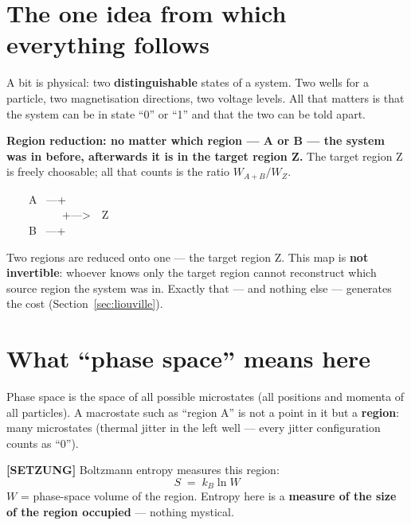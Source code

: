 \section{The one idea from which everything follows}

A bit is physical: two \textbf{distinguishable} states of a system. Two wells for
a particle, two magnetisation directions, two voltage levels. All that matters is
that the system can be in state “0” or “1” and that the two can be told apart.

\textbf{Region reduction: no matter which region --- A or B --- the system was in
before, afterwards it is in the target region Z.} The target region Z is freely
choosable; all that counts is the ratio $W_{A+B}/W_Z$.

\begin{center}
\begin{minipage}{0.42\textwidth}
\ttfamily\small
\begin{tabbing}
\ \ \ \ A \ ---+\\
\ \ \ \ \ \ \ \ \ \ +--->\ \ Z\\
\ \ \ \ B \ ---+
\end{tabbing}
\end{minipage}
\end{center}

Two regions are reduced onto one --- the target region Z. This map is
\textbf{not invertible}: whoever knows only the target region cannot reconstruct
which source region the system was in. Exactly that --- and nothing else ---
generates the cost (Section~\ref{sec:liouville}).

\section{What “phase space” means here}

Phase space is the space of all possible microstates (all positions and momenta of
all particles). A macrostate such as “region A” is not a point in it but a
\textbf{region}: many microstates (thermal jitter in the left well --- every
jitter configuration counts as “0”).

\textbf{[SETZUNG]} Boltzmann entropy measures this region:
\[
  S \;=\; k_B \ln W
\]
$W$ = phase-space volume of the region. Entropy here is a \textbf{measure of the
size of the region occupied} --- nothing mystical.

